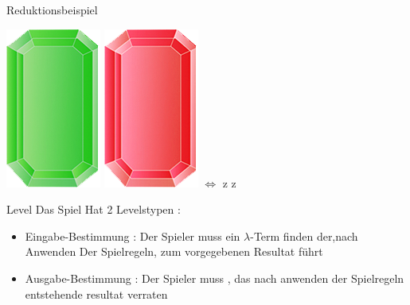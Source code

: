 \documentclass[18pt]{beamer}
\begin{document}
\begin{frame}{Reduktionsbeispiel}

\includegraphics[scale=0.5]{Pictures/gem_green}
\includegraphics[scale=0.5]{Pictures/gem_red}
\thinspace \thinspace \thinspace \thinspace \thinspace \thinspace $\Leftrightarrow$ \thinspace \thinspace \thinspace \thinspace \thinspace \thinspace  z z  
\end{frame}

\begin{frame}{Level}
Das Spiel Hat 2  Levelstypen  : 
\begin{itemize}
\item Eingabe-Bestimmung : Der Spieler muss  ein $\lambda$-Term finden der,nach Anwenden Der Spielregeln, zum vorgegebenen Resultat führt 
\item Ausgabe-Bestimmung : Der Spieler muss , das  nach anwenden der Spielregeln entstehende resultat verraten 
\end{itemize}

\end{frame}
\end{document}
